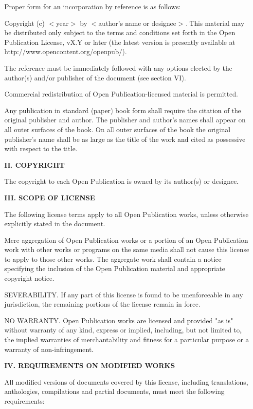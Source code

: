 Proper form for an incorporation by reference is as follows:

Copyright (c) $<$year$>$ by $<$author's name or designee$>$.  This material
may be distributed only subject to the terms and conditions set forth in
the Open Publication License, vX.Y or later (the latest version is
presently available at http://www.opencontent.org/openpub/).

The reference must be immediately followed with any options elected by
the author(s) and/or publisher of the document (see section VI).

Commercial redistribution of Open Publication-licensed material is
permitted.

Any publication in standard (paper) book form shall require the citation
of the original publisher and author. The publisher and author's names
shall appear on all outer surfaces of the book. On all outer surfaces of
the book the original publisher's name shall be as large as the title of
the work and cited as possessive with respect to the title.

{\bf II. COPYRIGHT}

The copyright to each Open Publication is owned by its author(s) or
designee.

{\bf III. SCOPE OF LICENSE}

The following license terms apply to all Open Publication works, unless
otherwise explicitly stated in the document.

Mere aggregation of Open Publication works or a portion of an Open
Publication work with other works or programs on the same media shall
not cause this license to apply to those other works. The aggregate work
shall contain a notice specifying the inclusion of the Open Publication
material and appropriate copyright notice.

SEVERABILITY. If any part of this license is found to be unenforceable
in any jurisdiction, the remaining portions of the license remain in
force.

NO WARRANTY. Open Publication works are licensed and provided "as is"
without warranty of any kind, express or implied, including, but not
limited to, the implied warranties of merchantability and fitness for a
particular purpose or a warranty of non-infringement.

{\bf IV. REQUIREMENTS ON MODIFIED WORKS}

All modified versions of documents covered by this license, including
translations, anthologies, compilations and partial documents, must meet
the following requirements:

